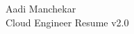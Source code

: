 \documentclass{article}
\begin{document}
\begin{center}
    \Huge Aadi Manchekar \\
    \Large Cloud Engineer Resume v2.0
\end{center}
\end{document}
